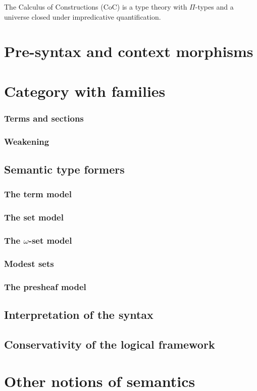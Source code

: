 \documentclass[a4paper]{article}
\begin{document}
The Calculus of Constructions (CoC) is a type theory with $\Pi$-types and a universe closed under impredicative quantification.

\section{Pre-syntax and context morphisms}\label{sec:pscm}
\section{Category with families}\label{sec:cwf}
\subsubsection{Terms and sections}\label{sec:tas}
\subsubsection{Weakening}\label{sec:w}
\subsection{Semantic type formers}\label{sec:stf}
\subsubsection{The term model}\label{sec:ttm}
\subsubsection{The set model}\label{sec:tsm}
\subsubsection{The $\omega$-set model}\label{sec:twsm}
\subsubsection{Modest sets}\label{sec:ms}
\subsubsection{The presheaf model}\label{sec:tpm}
\subsection{Interpretation of the syntax}\label{sec:iots}
\subsection{Conservativity of the logical framework}\label{sec:cotlf}
\section{Other notions of semantics}\label{sec:onos}



\end{document}
